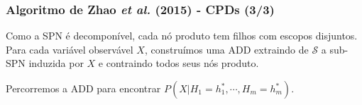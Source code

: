 \documentclass[dvipsnames]{beamer}
\begin{document}
  \begin{frame}
    \frametitle{Algoritmo de Zhao \emph{et al.} (2015) - CPDs (3/3)}

    Como a SPN é decomponível, cada nó produto tem filhos com escopos disjuntos. Para cada variável observável $X$, construímos uma ADD extraindo de $\mathcal{S}$ a sub-SPN induzida por $X$ e contraindo todos seus nós produto.

    \vspace{1em}

    Percorremos a ADD para encontrar $P(X | H_1 = h_1^*, \cdots, H_m = h_m^*)$.






  \end{frame}
\end{document}
